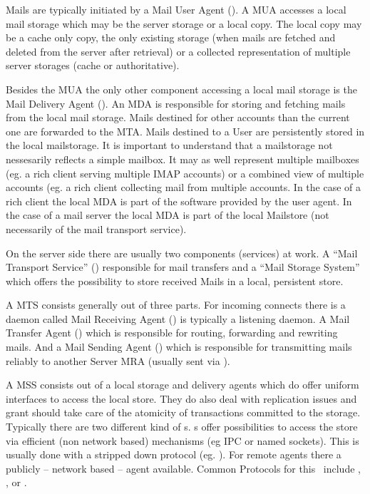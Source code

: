 Mails are typically initiated by a Mail User Agent (). A MUA accesses a local mail storage which may be the server storage or a local copy. The local copy may be a cache only copy, the only existing storage (when mails are fetched and deleted from the server after retrieval) or a collected representation of multiple server storages (cache or authoritative).\par

Besides the MUA the only other component accessing a local mail storage is the Mail Delivery Agent (). An MDA is responsible for storing and fetching mails from the local mail storage. Mails destined for other accounts than the current one are forwarded to the MTA. Mails destined to a User are persistently stored  in the local mailstorage. It is important to understand that a mailstorage not nessesarily reflects a simple mailbox. It may as well represent multiple mailboxes (eg. a rich client serving multiple IMAP accounts) or a combined view of multiple accounts (eg. a rich client collecting mail from multiple  accounts. In the case of a rich client the local MDA is part of the software provided by the user agent. In the case of a mail server the local MDA is part of the local Mailstore (not necessarily of the mail transport service).

On the server side there are usually two components (services) at work. A ``Mail Transport Service'' () responsible for mail transfers and a ``Mail Storage System'' which offers the possibility to store received Mails in a local, persistent store.\par

A MTS consists generally out of three parts. For incoming connects there is a daemon called Mail Receiving Agent () is typically a  listening daemon. A Mail Transfer Agent () which is responsible for routing, forwarding and rewriting mails. And a Mail Sending Agent () which is responsible for transmitting mails reliably to another Server MRA (usually sent via ).\par

A MSS consists out of a local storage and delivery agents which do offer uniform interfaces to access the local store. They do also deal with replication issues and grant should take care of the atomicity of transactions committed to the storage. Typically there are two different kind of s. s offer possibilities to access the store via efficient (non network based) mechanisms (eg IPC or named sockets). This is usually done with a stripped down protocol (eg. ). For remote agents there a publicly -- network based -- agent available. Common Protocols for this \ include , , or .\par

